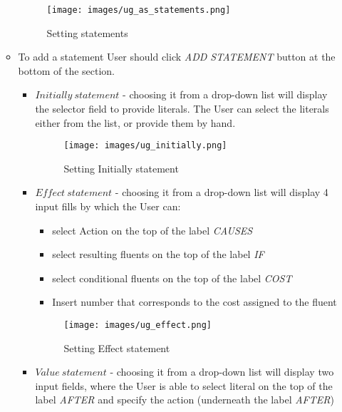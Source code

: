 \documentclass[a4paper]{article}
\begin{document}
\begin{itemize}
\begin{itemize}
            \begin{figure}[H]
                        \centering
                        \texttt{[image: images/ug\_as\_statements.png]}
                        \caption{Setting statements}
                        \label{fig:cm-rho-001}
                    \end{figure}
        \item[] To add a statement User should click \textit{ADD STATEMENT} button at the bottom of the section.
            \begin{itemize}
                \item $Initially~statement$ - choosing it from a drop-down list will display the selector field to provide literals. The User can select the literals either from the list, or provide them by hand.
                    \begin{figure}[H]
                        \centering
                        \texttt{[image: images/ug\_initially.png]}
                        \caption{Setting Initially statement}
                        \label{fig:cm-rho-001}
                    \end{figure}
                \item $Effect~statement$ - choosing it from a drop-down list will display 4 input fills by which the User can:
                    \begin{itemize}
                        \item select Action on the top of the label \textit{CAUSES}
                        \item select resulting fluents on the top of the label \textit{IF}
                        \item select conditional fluents on the top of the label \textit{COST}
                        \item Insert number that corresponds to the cost assigned to the fluent
                    \end{itemize}
                    \begin{figure}[H]
                        \centering
                        \texttt{[image: images/ug\_effect.png]}
                        \caption{Setting Effect statement}
                        \label{fig:cm-rho-001}
                    \end{figure}
                \item $Value~statement$ - choosing it from a drop-down list will display two input fields, where the User is able to select literal on the top of the label \textit{AFTER} and specify the action (underneath the label \textit{AFTER})

\end{itemize}
\end{itemize}
\end{itemize}
\end{document}
